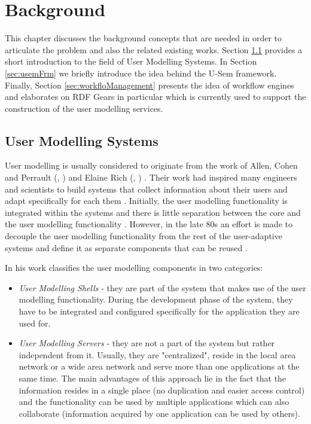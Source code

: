 
\chapter{\label{cha:background}Background}
This chapter discusses the background concepts that are needed in order to articulate the problem and also the related existing works. Section \ref{sec:userModellingSystems} provides a short introduction to the field of User Modelling Systems. In Section \ref{sec:usemFrm} we briefly introduce the idea behind the U-Sem framework. Finally, Section \ref{sec:workfloManagement} presents the idea of workflow engines and elaborates on RDF Gears in particular which is currently used to support the construction of the user modelling services.

\section{User Modelling Systems}
\label{sec:userModellingSystems}

User modelling is usually considered to originate from the work of Allen, Cohen and Perrault (\cite{allen1979plan}, \cite{cohen1979elements}) and Elaine Rich (\cite{rich1979building}, \cite{rich1979user}) \cite{kobsa2001generic}. Their work had inspired many engineers and scientists to build systems that collect information about their users and adapt specifically for each them \cite{wahlster1989user}. Initially, the user modelling functionality is integrated within the systems and there is little separation between the core and the user modelling functionality \cite{kobsa2001generic}. However, in the late 80s an effort is made to decouple the user modelling functionality from the rest of the user-adaptive systems and define it as separate components that can be reused \cite{kobsa2001generic}. 

In his work \cite{kobsa2001generic} classifies the user modelling components in two categories:
\begin{itemize}
	\item \textit{User Modelling Shells} - they are part of the system that makes use of the user modelling functionality. During the development phase of the system, they have to be integrated and configured specifically for the application they are used for.
	\item \textit{User Modelling Servers} - they are not a part of the system but rather independent from it. Usually, they are "centralized", reside in the local area network or a wide area network and serve more than one applications at the same time. The main advantages of this approach lie in the fact that the information resides in a single place (no duplication and easier access control) and the functionality can be used by multiple applications which can also collaborate (information acquired by one application can be used by others).
\end{itemize}

